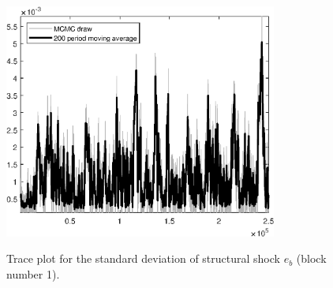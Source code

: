 \begin{figure}[H]
\centering
  \includegraphics[width=0.8\textwidth]{BRS_aggregate/graphs/TracePlot_SE_e_b_blck_1}\\
    \caption{Trace plot for the standard deviation of structural shock ${e_b}$ (block number 1).}
\end{figure}
